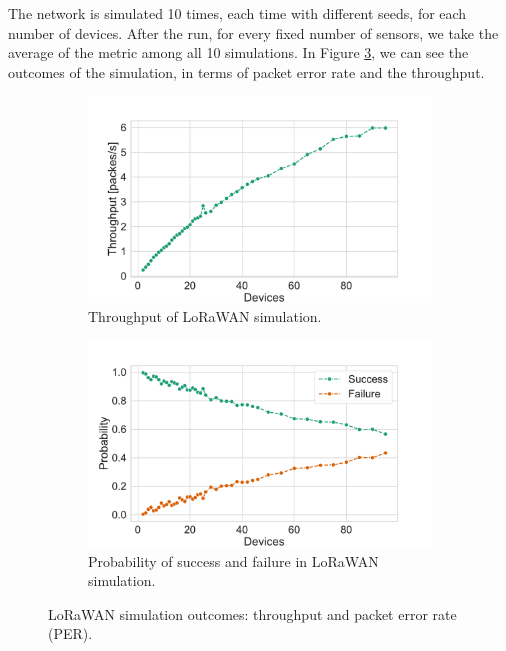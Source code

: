 \documentclass[10pt, a4paper, twocolumn]{article}
\theoremstyle{definition}
\begin{document}
The network is simulated 10 times, each time with different seeds, for each number of devices. After the run, for every fixed number of sensors, we take the average of the metric among all 10 simulations. In Figure \ref{fig:simulation}, we can see the outcomes of the simulation, in terms of packet error rate and the throughput.


\begin{figure}\centering
\begin{subfigure}{0.50\textwidth}
    \includegraphics[scale=0.40]{images/lorawan_throughput.pdf}
    \caption{Throughput of LoRaWAN simulation.}
    \label{fig:throughput}
\end{subfigure}

\begin{subfigure}{0.50\textwidth}
    \includegraphics[scale=0.40]{images/lorawan_prob.pdf}
    \caption{Probability of success and failure in LoRaWAN simulation.}
    \label{fig:PER}
\end{subfigure} 
\caption{LoRaWAN simulation outcomes: throughput and packet error rate (PER).}
\label{fig:simulation}
\end{figure}
\end{document}
